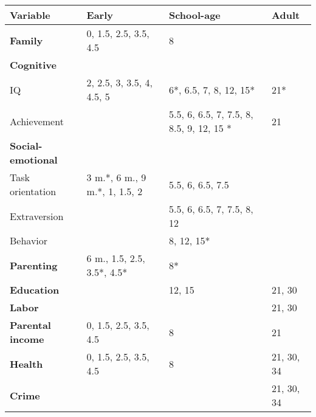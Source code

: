 \begin{tabular}{l l l l}
\toprule
Variable & Early & School-age & Adult  \\
\midrule
\textbf{Family} & 0, 1.5, 2.5, 3.5, 4.5 & 8 & \\
\textbf{Cognitive} & \\
\quad IQ & 2, 2.5, 3, 3.5, 4, 4.5, 5 & 6*, 6.5, 7, 8, 12, 15* & 21* \\
\quad Achievement &  & 5.5, 6, 6.5, 7, 7.5, 8, 8.5, 9, 12, 15 * & 21\\
\textbf{Social-emotional} & & & \\
\quad Task orientation & 3 m.*, 6 m., 9 m.*, 1, 1.5, 2  & 5.5, 6, 6.5, 7.5& \\
\quad Extraversion & & 5.5, 6, 6.5, 7, 7.5, 8, 12 & \\
\quad Behavior &  & 8, 12, 15* & \\ 
\textbf{Parenting} & 6 m., 1.5, 2.5, 3.5*, 4.5* & 8* & \\
\textbf{Education} & & 12, 15 & 21, 30 \\
\textbf{Labor} & & & 21, 30 \\
\textbf{Parental income} & 0, 1.5, 2.5, 3.5, 4.5 & 8 & 21 \\
\textbf{Health} & 0, 1.5, 2.5, 3.5, 4.5 & 8 & 21, 30, 34 \\
\textbf{Crime} & & & 21, 30, 34 \\
\bottomrule
\end{tabular}